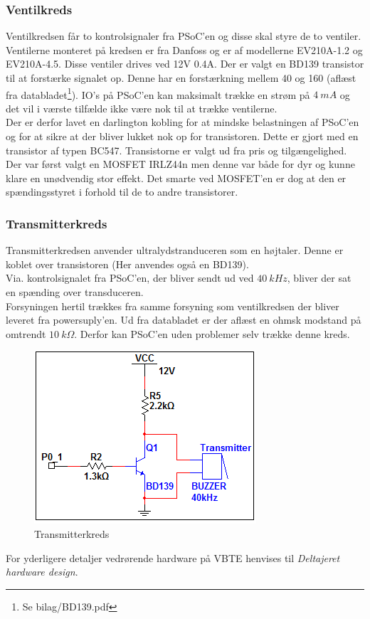 \subsubsection{Ventilkreds}
Ventilkredsen får to kontrolsignaler fra PSoC'en og disse skal styre de to ventiler. Ventilerne monteret på kredsen er fra Danfoss og er af modellerne EV210A-1.2 og EV210A-4.5. Disse ventiler drives ved 12V 0.4A. Der er valgt en BD139 transistor til at forstærke signalet op. Denne har en forstærkning mellem 40 og 160 (aflæst fra databladet\footnote{Se bilag/BD139.pdf}). IO's på PSoC'en kan maksimalt trække en strøm på $\SI{4}{mA}$ og det vil i værste tilfælde ikke være nok til at trække ventilerne.\\
Der er derfor lavet en darlington kobling for at mindske belastningen af PSoC'en og for at sikre at der bliver lukket nok op for transistoren. Dette er gjort med en transistor af typen BC547. Transistorne er valgt ud fra pris og tilgængelighed. Der var først valgt en MOSFET IRLZ44n men denne var både for dyr og kunne klare en unødvendig stor effekt. Det smarte ved MOSFET'en er dog at den er spændingsstyret i forhold til de to andre transistorer. 
\subsubsection{Transmitterkreds}
Transmitterkredsen anvender ultralydstranduceren som en højtaler. Denne er koblet over transistoren (Her anvendes også en BD139).\\
Via. kontrolsignalet fra PSoC'en, der bliver sendt ud ved $\SI{40}{kHz}$, bliver der sat en spænding over transduceren.\\ 
Forsyningen hertil trækkes fra samme forsyning som ventilkredsen der bliver leveret fra powersuply'en. Ud fra databladet er der aflæst en ohmsk modstand på omtrendt $\SI{10}{k}\Omega$. Derfor kan PSoC'en uden problemer selv trække denne kreds.
\begin{figure}[H]
\centering
\includegraphics[width = .5\textwidth]{billeder/transmitterkreds}
\caption{Transmitterkreds}
\end{figure}
For yderligere detaljer vedrørende hardware på VBTE henvises til \textit{Deltajeret hardware design}.

